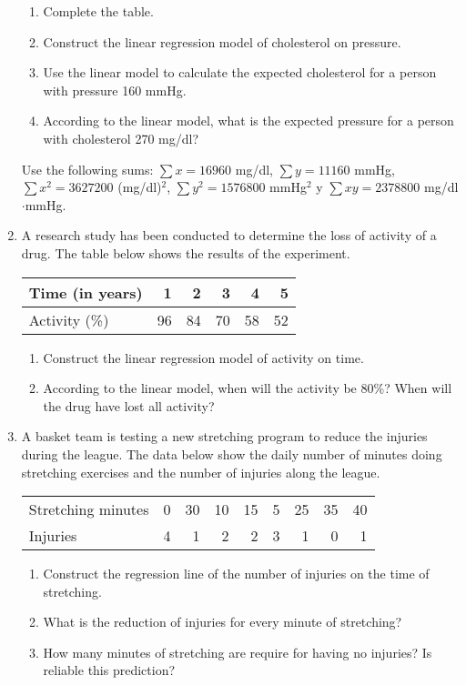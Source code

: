\begin{enumerate}[leftmargin=*,resume]
\begin{enumerate}
\item Complete the table.
\item Construct the linear regression model of cholesterol on pressure. 
\item Use the linear model to calculate the expected cholesterol for a person with pressure 160 mmHg. 
\item According to the linear model, what is the expected pressure for a person with cholesterol 270 mg/dl?
\end{enumerate}

Use the following sums:
$\sum x=16960$ mg/dl, $\sum y=11160$ mmHg, $\sum x^2=3627200$ (mg/dl)$^2$, $\sum y^2=1576800$ mmHg$^2$ y
$\sum xy=2378800$ mg/dl$\cdot$mmHg.

\item A research study has been conducted to determine the loss of activity of a drug.
The table below shows the results of the experiment.

\begin{center}
\begin{tabular}{|l|r|r|r|r|r|}
\hline
Time (in years) & 1 & 2 & 3 & 4 & 5 \\ \hline
Activity (\%) & 96 & 84 & 70 & 58 & 52 \\ \hline
\end{tabular}
\end{center}

\begin{enumerate}
\item  Construct the linear regression model of activity on time.
\item  According to the linear model, when will the activity be 80\%? When will the drug have lost all activity?
\end{enumerate}

\item A basket team is testing a new stretching program to reduce the injuries during the league. 
The data below show the daily number of minutes doing stretching exercises and the number of injuries along the league. 
\begin{center}
\begin{tabular}{lrrrrrrrr}
\toprule
Stretching minutes & 0 & 30 & 10 & 15 & 5 & 25 & 35 & 40\\
Injuries & 4 & 1 & 2 & 2 & 3 & 1 & 0 & 1\\
\bottomrule
\end{tabular}
\end{center}
\begin{enumerate}
\item Construct the regression line of the number of injuries on the time of stretching. 
\item What is the reduction of injuries for every minute of stretching? 
\item How many minutes of stretching are require for having no injuries? Is reliable this prediction?
\end{enumerate}


\end{enumerate}
